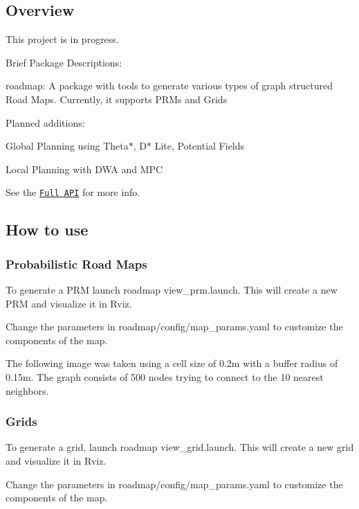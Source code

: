 \subsection*{Overview}

This project is in progress.

Brief Package Descriptions\+:
\begin{DoxyItemize}
\item {\ttfamily roadmap}\+: A package with tools to generate various types of graph structured Road Maps. Currently, it supports P\+R\+Ms and Grids
\end{DoxyItemize}

Planned additions\+:
\begin{DoxyItemize}
\item Global Planning using Theta$\ast$, D$\ast$ Lite, Potential Fields
\item Local Planning with D\+WA and M\+PC
\end{DoxyItemize}

See the \href{https://rencheckyoself.github.io/motion-planning-in-ROS/}{\tt Full A\+PI} for more info.

\subsection*{How to use}

\subsubsection*{Probabilistic Road Maps}

To generate a P\+RM launch {\ttfamily roadmap view\+\_\+prm.\+launch}. This will create a new P\+RM and visualize it in Rviz.

Change the parameters in {\ttfamily roadmap/config/map\+\_\+params.\+yaml} to customize the components of the map.

The following image was taken using a cell size of 0.\+2m with a buffer radius of 0.\+15m. The graph consists of 500 nodes trying to connect to the 10 nearest neighbors.  \subsubsection*{Grids}

To generate a grid, launch {\ttfamily roadmap view\+\_\+grid.\+launch}. This will create a new grid and visualize it in Rviz.

Change the parameters in {\ttfamily roadmap/config/map\+\_\+params.\+yaml} to customize the components of the map.

